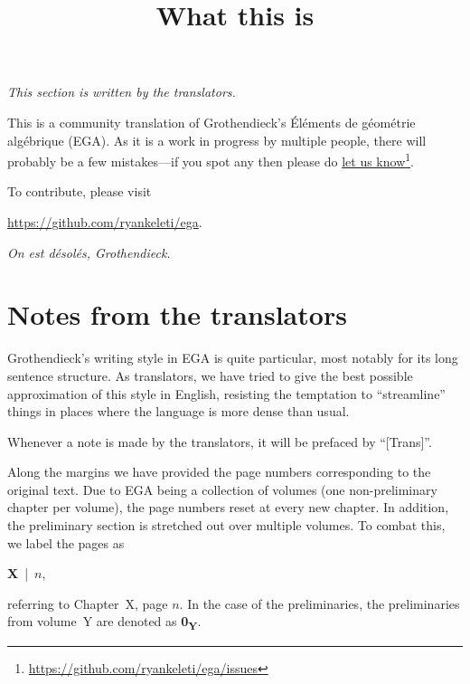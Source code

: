 


\title{What this is}
\maketitle

\label{section-phantom}

\noindent
\emph{This section is written by the translators.}

\noindent
This is a community translation of Grothendieck's \'El\'ements de g\'eom\'etrie alg\'ebrique (EGA).
As it is a work in progress by multiple people, there will probably be a few mistakes---if you spot any then please do \href{https://github.com/ryankeleti/ega/issues}{let us know}\footnote{\url{https://github.com/ryankeleti/ega/issues}}.

\noindent
To contribute, please visit
\begin{center}
  \url{https://github.com/ryankeleti/ega}.
\end{center}

\noindent
\emph{On est d\'esol\'es, Grothendieck.}

\section*{Notes from the translators}
Grothendieck's writing style in EGA is quite particular, most notably for its long sentence structure.
As translators, we have tried to give the best possible approximation of this style in English, resisting the temptation to ``streamline'' things in places where the language is more dense than usual.

\sectionbreak

Whenever a note is made by the translators, it will be prefaced by ``[Trans]''.

\sectionbreak

Along the margins we have provided the page numbers corresponding to the original text.
Due to EGA being a collection of volumes (one non-preliminary chapter per volume), the page numbers reset at every new chapter.
In addition, the preliminary section is stretched out over multiple volumes.
To combat this, we label the pages as
\begin{center}
  \textbf{X}~|~$n$,
\end{center}
referring to Chapter~X, page $n$.
In the case of the preliminaries, the preliminaries from volume~Y are denoted as \textbf{0\textsubscript{Y}}.

